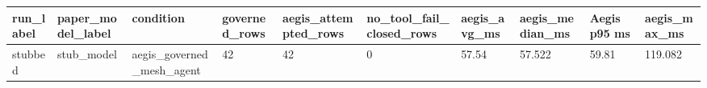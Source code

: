 \begin{tabular}{llllllllll}
 \hline
run\_label & paper\_model\_label & condition & governed\_rows & aegis\_attempted\_rows & no\_tool\_fail\_closed\_rows & aegis\_avg\_ms & aegis\_median\_ms & Aegis p95 ms & aegis\_max\_ms \\
 \hline
stubbed & stub\_model & aegis\_governed\_mesh\_agent & 42 & 42 & 0 & 57.54 & 57.522 & 59.81 & 119.082 \\
 \hline
\end{tabular}
